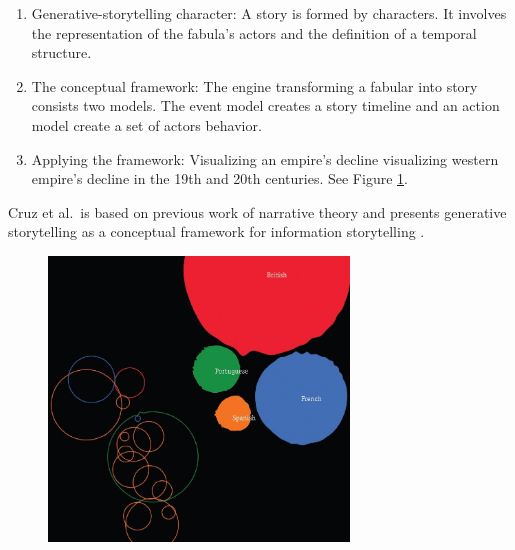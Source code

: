 \documentclass{egpubl}
\begin{document}
\begin{enumerate}
\item Generative-storytelling character: A story is formed by characters. It involves the representation of the fabula's actors and the definition of a temporal structure.
\item The conceptual framework: The engine transforming a fabular into story consists two models. The event model creates a story timeline and an action model create a set of actors behavior.
\item Applying the framework: Visualizing an empire's decline visualizing western empire's decline in the 19th and 20th centuries. See Figure \ref{cruz2011}.
\end{enumerate}
Cruz et al.\ is based on  previous work of narrative theory\cite{naratology1985} and presents generative storytelling as a conceptual framework for information storytelling \cite{cruz2011}.

\begin{figure}
\begingroup
\centering
\includegraphics[width=8cm]{./images/cruz2011}
\label{cruz2011}
\endgroup
\end{figure}
\end{document}
